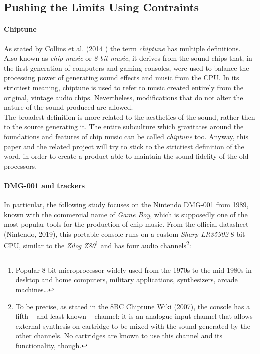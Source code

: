 \documentclass[]{article}
\begin{document}
    \subsection{Pushing the Limits Using Contraints}
        \paragraph{Chiptune} %
        As stated by Collins et al. (2014 )\nocite{COLLINS2014} the term \emph{chiptune} has multiple 
        definitions. Also known as \emph{chip music} or \emph{8-bit music}, it derives from the sound chips that,
         in the first generation of computers and gaming consoles,
         were used to balance the processing power of generating sound effects and music from the
        CPU. In its strictiest meaning, chiptune is used to refer to music created entirely from the original, vintage audio 
        chips. Nevertheless, modifications that do not alter the nature of the sound produced are allowed.\\
        The broadest definition is more related to the aesthetics of the sound, rather then to the source
        generating it. The entire subculture which gravitates around the foundations and features of chip
        music can be called \emph{chiptune} too. Anyway, this paper and the related project will try to stick
        to the strictiest definition of the word, in order to create a product able to maintain the sound fidelity
        of the old processors.

        \paragraph{DMG-001 and trackers} %
        In particular, the following study focuses on the Nintendo DMG-001 from 1989, known with the commercial 
        name of \emph{Game Boy}, which is supposedly one of the most popular tools for the production of chip music.
        From the official datasheet (Nintendo, 2019)\nocite{NINTENDO2019}, this portable console runs on a custom 
        \emph{Sharp LR35902} 8-bit CPU, similar to the \emph{Zilog Z80}\footnote{Popular 8-bit microprocessor widely used 
        from the 1970s to the mid-1980s in desktop and home computers, military applications, synthesizers, arcade machines\ldots} 
        and has four audio channels\footnote{To be precise, as stated in the 8BC Chiptune Wiki (2007)\nocite{8BCCHIPTUNE2007}, 
        the console has a fifth -- and least known -- channel: it is an analogue input channel that allows 
        external synthesis on cartridge to be mixed with the sound generated by the other channels. No cartridges 
        are known to use this channel and its functionality, though.}:\\
       
\end{document}
